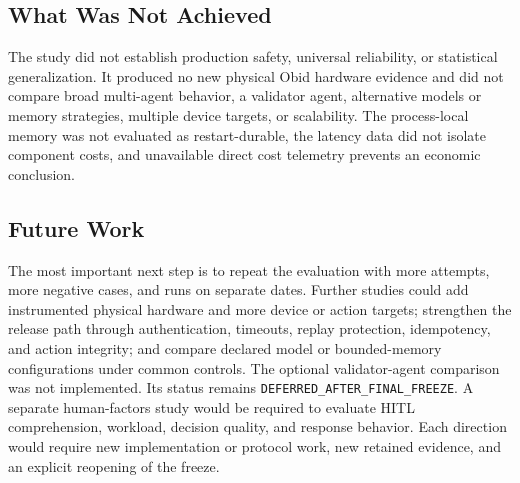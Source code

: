 \subsection{What Was Not Achieved}\label{subsec:conclusions-not-achieved}

The study did not establish production safety, universal reliability, or
statistical generalization. It produced no new physical Obid hardware evidence
and did not compare broad multi-agent behavior, a validator agent, alternative
models or memory strategies, multiple device targets, or scalability. The
process-local memory was not evaluated as restart-durable, the latency data did
not isolate component costs, and unavailable direct cost telemetry prevents an
economic conclusion.

\subsection{Future Work}\label{subsec:conclusions-future}

The most important next step is to repeat the evaluation with more attempts,
more negative cases, and runs on separate dates. Further studies
could add instrumented physical hardware and more device or action targets;
strengthen the release path through authentication, timeouts, replay protection,
idempotency, and action integrity; and compare declared model or bounded-memory
configurations under common controls. The optional validator-agent comparison
was not implemented. Its status remains
\texttt{DEFERRED\_AFTER\_FINAL\_FREEZE}. A
separate human-factors study would be required to evaluate HITL comprehension,
workload, decision quality, and response behavior. Each direction would require
new implementation or protocol work, new retained evidence, and an explicit
reopening of the freeze.

